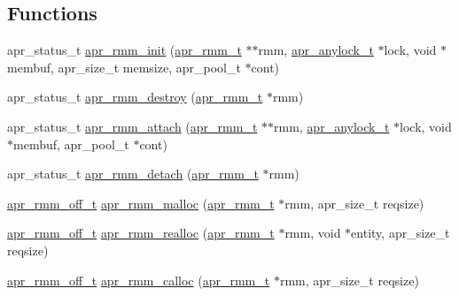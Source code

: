 \subsection*{Functions}
\begin{DoxyCompactItemize}
\item 
apr\-\_\-status\-\_\-t \hyperlink{group___a_p_r___util___r_m_m_ga65ebaca1a86f0667156592f40b81b681}{apr\-\_\-rmm\-\_\-init} (\hyperlink{group___a_p_r___util___r_m_m_gadb4d418c417ece33c4430ba9df59070a}{apr\-\_\-rmm\-\_\-t} $\ast$$\ast$rmm, \hyperlink{structapr__anylock__t}{apr\-\_\-anylock\-\_\-t} $\ast$lock, void $\ast$membuf, apr\-\_\-size\-\_\-t memsize, apr\-\_\-pool\-\_\-t $\ast$cont)
\item 
apr\-\_\-status\-\_\-t \hyperlink{group___a_p_r___util___r_m_m_ga8ccae93038489f2acb7588292df5d80a}{apr\-\_\-rmm\-\_\-destroy} (\hyperlink{group___a_p_r___util___r_m_m_gadb4d418c417ece33c4430ba9df59070a}{apr\-\_\-rmm\-\_\-t} $\ast$rmm)
\item 
apr\-\_\-status\-\_\-t \hyperlink{group___a_p_r___util___r_m_m_gadf144b4071c5c4d85cded37ca0e58dff}{apr\-\_\-rmm\-\_\-attach} (\hyperlink{group___a_p_r___util___r_m_m_gadb4d418c417ece33c4430ba9df59070a}{apr\-\_\-rmm\-\_\-t} $\ast$$\ast$rmm, \hyperlink{structapr__anylock__t}{apr\-\_\-anylock\-\_\-t} $\ast$lock, void $\ast$membuf, apr\-\_\-pool\-\_\-t $\ast$cont)
\item 
apr\-\_\-status\-\_\-t \hyperlink{group___a_p_r___util___r_m_m_ga2171746dcfa1e0f07717224ad106091e}{apr\-\_\-rmm\-\_\-detach} (\hyperlink{group___a_p_r___util___r_m_m_gadb4d418c417ece33c4430ba9df59070a}{apr\-\_\-rmm\-\_\-t} $\ast$rmm)
\item 
\hyperlink{group___a_p_r___util___r_m_m_ga70b508c81a0bc75350efdefb3410af12}{apr\-\_\-rmm\-\_\-off\-\_\-t} \hyperlink{group___a_p_r___util___r_m_m_ga31e42a7c40bbd3f7f132eaf347a79d32}{apr\-\_\-rmm\-\_\-malloc} (\hyperlink{group___a_p_r___util___r_m_m_gadb4d418c417ece33c4430ba9df59070a}{apr\-\_\-rmm\-\_\-t} $\ast$rmm, apr\-\_\-size\-\_\-t reqsize)
\item 
\hyperlink{group___a_p_r___util___r_m_m_ga70b508c81a0bc75350efdefb3410af12}{apr\-\_\-rmm\-\_\-off\-\_\-t} \hyperlink{group___a_p_r___util___r_m_m_ga78561452a8fb3fef18f1203efaa0b92f}{apr\-\_\-rmm\-\_\-realloc} (\hyperlink{group___a_p_r___util___r_m_m_gadb4d418c417ece33c4430ba9df59070a}{apr\-\_\-rmm\-\_\-t} $\ast$rmm, void $\ast$entity, apr\-\_\-size\-\_\-t reqsize)
\item 
\hyperlink{group___a_p_r___util___r_m_m_ga70b508c81a0bc75350efdefb3410af12}{apr\-\_\-rmm\-\_\-off\-\_\-t} \hyperlink{group___a_p_r___util___r_m_m_ga12ff2a4c23548e2f1616a17734defaf8}{apr\-\_\-rmm\-\_\-calloc} (\hyperlink{group___a_p_r___util___r_m_m_gadb4d418c417ece33c4430ba9df59070a}{apr\-\_\-rmm\-\_\-t} $\ast$rmm, apr\-\_\-size\-\_\-t reqsize)

\end{DoxyCompactItemize}
